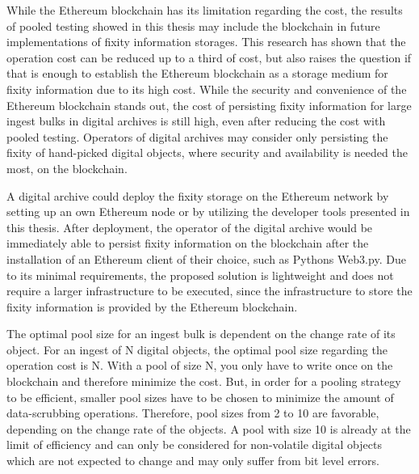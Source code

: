 While the Ethereum blockchain has its limitation regarding the cost, the results of pooled testing showed in this thesis may include the blockchain in future implementations of fixity information storages. This research has shown that the operation cost can be reduced up to a third of cost, but also raises the question if that is enough to establish the Ethereum blockchain as a storage medium for fixity information due to its high cost. While the security and convenience of the Ethereum blockchain stands out, the cost of persisting fixity information for large ingest bulks in digital archives is still high, even after reducing the cost with pooled testing. Operators of digital archives may consider only persisting the fixity of hand-picked digital objects, where security and availability is needed the most, on the blockchain.

A digital archive could deploy the fixity storage on the Ethereum network by setting up an own Ethereum node or by utilizing the developer tools presented in this thesis. After deployment, the operator of the digital archive would be immediately able to persist fixity information on the blockchain after the installation of an Ethereum client of their choice, such as Pythons Web3.py. Due to its minimal requirements, the proposed solution is lightweight and does not require a larger infrastructure to be executed, since the infrastructure to store the fixity information is provided by the Ethereum blockchain.

The optimal pool size for an ingest bulk is dependent on the change rate of its object. For an ingest of N digital objects, the optimal pool size regarding the operation cost is N. With a pool of size N, you only have to write once on the blockchain and therefore minimize the cost. But, in order for a pooling strategy to be efficient, smaller pool sizes have to be chosen to minimize the amount of data-scrubbing operations. Therefore, pool sizes from 2 to 10 are favorable, depending on the change rate of the objects. A pool with size 10 is already at the limit of efficiency and can only be considered for non-volatile digital objects which are not expected to change and may only suffer from bit level errors.

